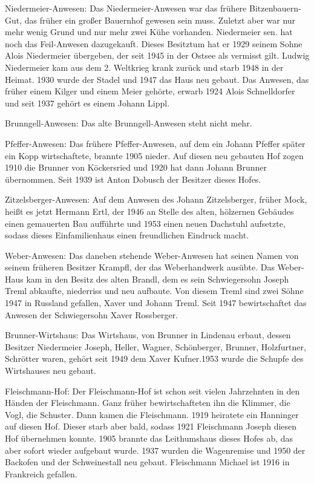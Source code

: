 \documentclass{book}
\begin{document}
Niedermeier-Anwesen: Das Niedermeier-Anwesen war das frühere Bitzenbauern-Gut,
das früher ein großer Bauernhof gewesen sein muss. Zuletzt aber war nur mehr
wenig Grund und nur mehr zwei Kühe vorhanden. Niedermeier sen. hat noch das
Feil-Anwesen dazugekauft. Dieses Besitztum hat er 1929 seinem Sohne Alois
Niedermeier übergeben, der seit 1945 in der Ostsee als vermisst gilt. Ludwig
Niedermeier kam aus dem 2. Weltkrieg krank zurück und starb 1948 in der Heimat.
1930 wurde der Stadel und 1947 das Haus neu gebaut. Das Anwesen, das früher
einem Kilger und einem Meier gehörte, erwarb 1924 Alois Schnelldorfer und seit
1937 gehört es einem Johann Lippl.

Brunngell-Anwesen: Das alte Brunngell-Anwesen steht nicht mehr.

Pfeffer-Anwesen: Das frühere Pfeffer-Anwesen, auf dem ein Johann Pfeffer später
ein Kopp wirtschaftete, brannte 1905 nieder. Auf diesen neu gebauten Hof zogen
1910 die Brunner von Köckersried und 1920 hat dann Johann Brunner übernommen.
Seit 1939 ist Anton Dobusch der Besitzer dieses Hofes.

Zitzelsberger-Anwesen: Auf dem Anwesen des Johann Zitzelsberger, früher Mock,
heißt es jetzt Hermann Ertl, der 1946 an Stelle des alten, hölzernen Gebäudes
einen gemauerten Bau aufführte und 1953 einen neuen Dachstuhl aufsetzte, sodass
dieses Einfamilienhaus einen freundlichen Eindruck macht.

Weber-Anwesen: Das daneben stehende Weber-Anwesen hat seinen Namen von seinem
früheren Besitzer Krampfl, der das Weberhandwerk ausübte. Das Weber-Haus kam in
den Besitz des alten Brandl, dem es sein Schwiegersohn Joseph Treml abkaufte,
niederriss und neu aufbaute. Von diesem Treml sind zwei Söhne 1947 in Russland
gefallen, Xaver und Johann Treml. Seit 1947 bewirtschaftet das Anwesen der
Schwiegersohn Xaver Rossberger.

Brunner-Wirtshaus: Das Wirtshaus, von Brunner in Lindenau erbaut, dessen
Besitzer Niedermeier Joseph, Heller, Wagner, Schönberger, Brunner, Holzfurtner,
Schrötter waren, gehört seit 1949 dem Xaver Kufner.1953 wurde die Schupfe des
Wirtshauses neu gebaut.

Fleischmann-Hof: Der Fleischmann-Hof ist schon seit vielen Jahrzehnten in den
Händen der Fleischmann. Ganz früher bewirtschafteten ihn die Klimmer, die Vogl,
die Schuster. Dann kamen die Fleischmann. 1919 heiratete ein Hanninger auf
diesen Hof. Dieser starb aber bald, sodass 1921 Fleischmann Joseph diesen Hof
übernehmen konnte. 1905 brannte das Leithumshaus dieses Hofes ab, das aber
sofort wieder aufgebaut wurde. 1937 wurden die Wagenremise und 1950 der Backofen
und der Schweinestall neu gebaut. Fleischmann Michael ist 1916 in Frankreich
gefallen.
\end{document}
